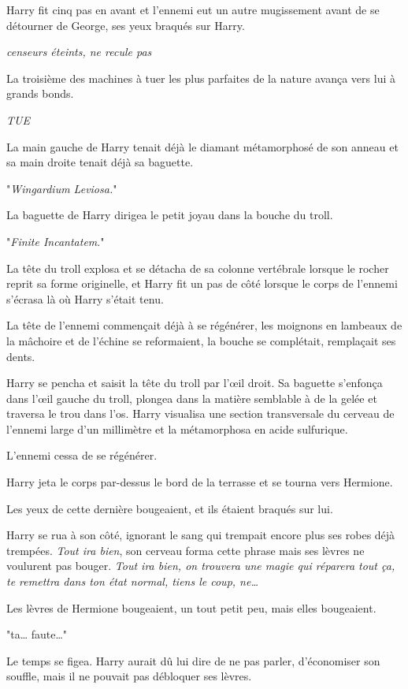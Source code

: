 Harry fit cinq pas en avant et l'ennemi eut un autre mugissement avant de se détourner de George, ses yeux braqués sur Harry.

\emph{censeurs éteints, ne recule pas}

La troisième des machines à tuer les plus parfaites de la nature avança vers lui à grands bonds.

\emph{TUE}

La main gauche de Harry tenait déjà le diamant métamorphosé de son anneau et sa main droite tenait déjà sa baguette.

"\emph{Wingardium Leviosa.}"

La baguette de Harry dirigea le petit joyau dans la bouche du troll.

"\emph{Finite Incantatem}."

La tête du troll explosa et se détacha de sa colonne vertébrale lorsque le rocher reprit sa forme originelle, et Harry fit un pas de côté lorsque le corps de l'ennemi s'écrasa là où Harry s'était tenu.

La tête de l'ennemi commençait déjà à se régénérer, les moignons en lambeaux de la mâchoire et de l'échine se reformaient, la bouche se complétait, remplaçait ses dents.

Harry se pencha et saisit la tête du troll par l'œil droit. Sa baguette s'enfonça dans l'œil gauche du troll, plongea dans la matière semblable à de la gelée et traversa le trou dans l'os. Harry visualisa une section transversale du cerveau de l'ennemi large d'un millimètre et la métamorphosa en acide sulfurique.

L'ennemi cessa de se régénérer.

Harry jeta le corps par-dessus le bord de la terrasse et se tourna vers Hermione.

Les yeux de cette dernière bougeaient, et ils étaient braqués sur lui.

Harry se rua à son côté, ignorant le sang qui trempait encore plus ses robes déjà trempées. \emph{Tout ira bien}, son cerveau forma cette phrase mais ses lèvres ne voulurent pas bouger. \emph{Tout ira bien, on trouvera une magie qui réparera tout ça, te remettra dans ton état normal, tiens le coup, ne…}

Les lèvres de Hermione bougeaient, un tout petit peu, mais elles bougeaient.

"ta… faute…"

Le temps se figea. Harry aurait dû lui dire de ne pas parler, d'économiser son souffle, mais il ne pouvait pas débloquer ses lèvres.

